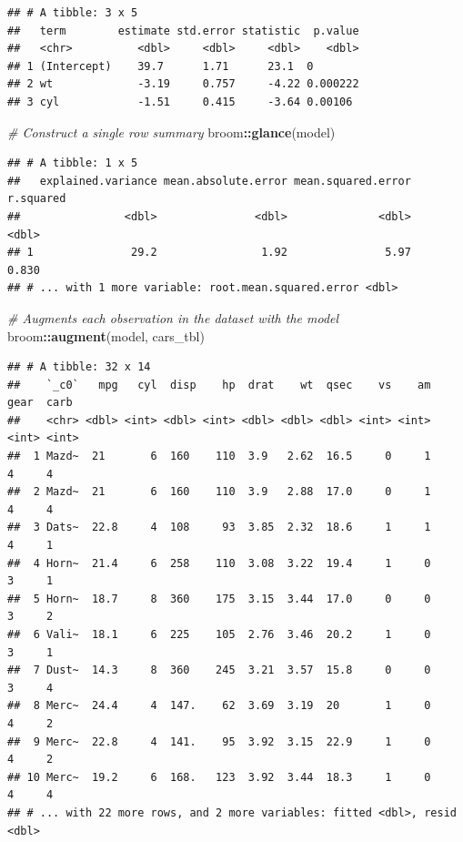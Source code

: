 \documentclass[]{book}
\newenvironment{Shaded}{\begin{snugshade}}{\end{snugshade}}
\newcommand{\CommentTok}[1]{\textcolor[rgb]{0.56,0.35,0.01}{\textit{#1}}}
\newcommand{\KeywordTok}[1]{\textcolor[rgb]{0.13,0.29,0.53}{\textbf{#1}}}
\newcommand{\NormalTok}[1]{#1}
\newcommand{\OperatorTok}[1]{\textcolor[rgb]{0.81,0.36,0.00}{\textbf{#1}}}
\theoremstyle{definition}
\theoremstyle{definition}
\theoremstyle{definition}
\theoremstyle{remark}
\begin{document}
\begin{verbatim}
## # A tibble: 3 x 5
##   term        estimate std.error statistic  p.value
##   <chr>          <dbl>     <dbl>     <dbl>    <dbl>
## 1 (Intercept)    39.7      1.71      23.1  0       
## 2 wt             -3.19     0.757     -4.22 0.000222
## 3 cyl            -1.51     0.415     -3.64 0.00106
\end{verbatim}

\begin{Shaded}
\begin{Highlighting}[]
\CommentTok{# Construct a single row summary}
\NormalTok{broom}\OperatorTok{::}\KeywordTok{glance}\NormalTok{(model)}
\end{Highlighting}
\end{Shaded}

\begin{verbatim}
## # A tibble: 1 x 5
##   explained.variance mean.absolute.error mean.squared.error r.squared
##                <dbl>               <dbl>              <dbl>     <dbl>
## 1               29.2                1.92               5.97     0.830
## # ... with 1 more variable: root.mean.squared.error <dbl>
\end{verbatim}

\begin{Shaded}
\begin{Highlighting}[]
\CommentTok{# Augments each observation in the dataset with the model}
\NormalTok{broom}\OperatorTok{::}\KeywordTok{augment}\NormalTok{(model, cars_tbl)}
\end{Highlighting}
\end{Shaded}

\begin{verbatim}
## # A tibble: 32 x 14
##    `_c0`   mpg   cyl  disp    hp  drat    wt  qsec    vs    am  gear  carb
##    <chr> <dbl> <int> <dbl> <int> <dbl> <dbl> <dbl> <int> <int> <int> <int>
##  1 Mazd~  21       6  160    110  3.9   2.62  16.5     0     1     4     4
##  2 Mazd~  21       6  160    110  3.9   2.88  17.0     0     1     4     4
##  3 Dats~  22.8     4  108     93  3.85  2.32  18.6     1     1     4     1
##  4 Horn~  21.4     6  258    110  3.08  3.22  19.4     1     0     3     1
##  5 Horn~  18.7     8  360    175  3.15  3.44  17.0     0     0     3     2
##  6 Vali~  18.1     6  225    105  2.76  3.46  20.2     1     0     3     1
##  7 Dust~  14.3     8  360    245  3.21  3.57  15.8     0     0     3     4
##  8 Merc~  24.4     4  147.    62  3.69  3.19  20       1     0     4     2
##  9 Merc~  22.8     4  141.    95  3.92  3.15  22.9     1     0     4     2
## 10 Merc~  19.2     6  168.   123  3.92  3.44  18.3     1     0     4     4
## # ... with 22 more rows, and 2 more variables: fitted <dbl>, resid <dbl>
\end{verbatim}
\end{document}
